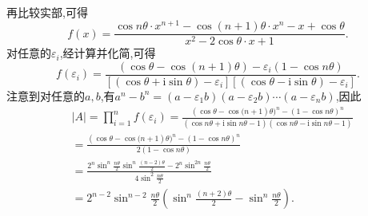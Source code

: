 \documentclass[../../main.tex]{subfiles}%
\begin{document}
\begin{solution}
\begin{align*}
\end{align*}
再比较实部,可得
\[
f(x)=\frac{\cos n\theta\cdot x^{n + 1}-\cos(n + 1)\theta\cdot x^n - x+\cos\theta}{x^2 - 2\cos\theta\cdot x + 1}.
\]
对任意的\(\varepsilon_i\),经计算并化简,可得
\[
f(\varepsilon _i)=\frac{\left( \cos \theta -\cos \left( n+1 \right) \theta \right) -\varepsilon _i\left( 1-\cos n\theta \right)}{\left[ \left( \cos \theta +\mathrm{i}\sin \theta \right) -\varepsilon _i \right] \left[ \left( \cos \theta -\mathrm{i}\sin \theta \right) -\varepsilon _i \right]}.
\]
注意到对任意的\(a,b\),有\(a^n - b^n=(a - \varepsilon_1b)(a - \varepsilon_2b)\cdots(a - \varepsilon_nb)\),因此
\begin{align*}
&\left| A \right|=\prod_{i=1}^n{f(\varepsilon _i)}=\frac{(\cos \theta -\cos\mathrm{(}n+1)\theta )^n-(1-\cos n\theta )^n}{(\cos n\theta +\mathrm{i}\sin n\theta -1)(\cos n\theta -\mathrm{i}\sin n\theta -1)}
\\
&=\frac{(\cos \theta -\cos\mathrm{(}n+1)\theta )^n-(1-\cos n\theta )^n}{2(1-\cos n\theta )}
\\
&=\frac{2^n\sin ^n\frac{n\theta}{2}\sin ^n\frac{\left( n-2 \right) \theta}{2}-2^n\sin ^{2n}\frac{n\theta}{2}}{4\sin ^2\frac{n\theta}{2}}
\\
&=2^{n-2}\sin ^{n-2}\frac{n\theta}{2}\left( \sin ^n\frac{(n+2)\theta}{2}-\sin ^n\frac{n\theta}{2} \right) .
\end{align*}

\end{solution}
\end{document}
